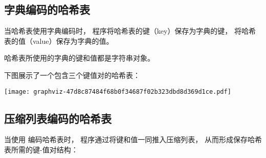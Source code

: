 \documentclass[a4paper,11pt,english]{sphinxmanual}
\begin{document}
\subsection{字典编码的哈希表}
\label{datatype/hash:id2}
当哈希表使用字典编码时，
程序将哈希表的键（key）保存为字典的键，
将哈希表的值（value）保存为字典的值。

哈希表所使用的字典的键和值都是字符串对象。

下图展示了一个包含三个键值对的哈希表：

\texttt{[image: graphviz-47d8c87484f68b0f34687f02b323dbd8d369d1ce.pdf]}


\subsection{压缩列表编码的哈希表}
\label{datatype/hash:id3}
当使用  编码哈希表时，
程序通过将键和值一同推入压缩列表，
从而形成保存哈希表所需的键-值对结构：
\end{document}
